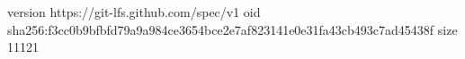 version https://git-lfs.github.com/spec/v1
oid sha256:f3cc0b9bfbfd79a9a984ce3654bce2e7af823141e0e31fa43cb493c7ad45438f
size 11121
